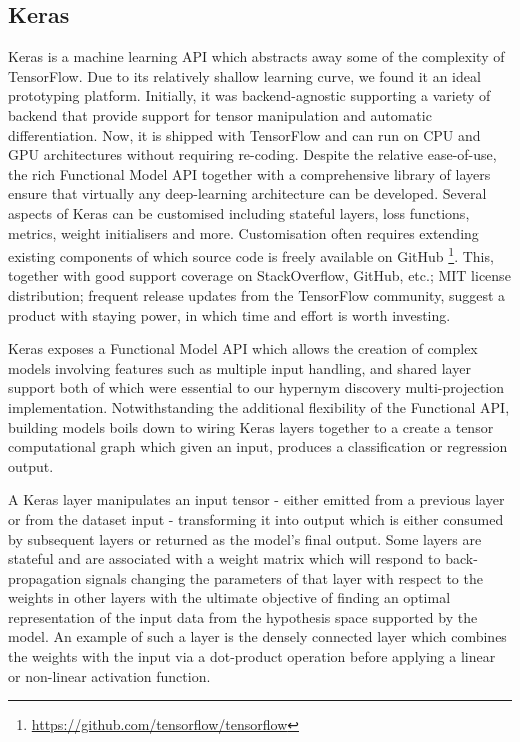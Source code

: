 \subsection{Keras}
Keras is a machine learning API which abstracts away some of the complexity of TensorFlow.  Due to its relatively shallow learning curve, we found it an ideal prototyping platform.  Initially, it was backend-agnostic supporting a variety of backend that provide support for tensor manipulation and automatic differentiation.  Now, it is shipped with TensorFlow and can run on CPU and GPU architectures without requiring re-coding.  Despite the relative ease-of-use, the rich Functional Model API together with a comprehensive library of layers ensure that virtually any deep-learning architecture can be developed.  Several aspects of Keras can be customised including stateful layers, loss functions, metrics, weight initialisers and more.  Customisation often requires extending existing components of which source code is freely available on GitHub \footnote{\url{https://github.com/tensorflow/tensorflow}}.  This, together with good support coverage on StackOverflow, GitHub, etc.; MIT license distribution; frequent release updates from the TensorFlow community, suggest a product with staying power, in which time and effort is worth investing.

Keras exposes a Functional Model API which allows the creation of complex models involving features such as multiple input handling, and shared layer support both of which were essential to our hypernym discovery multi-projection implementation.  Notwithstanding the additional flexibility of the Functional API, building models boils down to wiring Keras layers together to a create a tensor computational graph which given an input, produces a classification or regression output.  

A Keras layer manipulates an input tensor - either emitted from a previous layer or from the dataset input - transforming it into output which is either consumed by subsequent layers or returned as the model's final output.  Some layers are stateful and are associated with a weight matrix which will respond to back-propagation signals changing the parameters of that layer with respect to the weights in other layers with the ultimate objective of finding an optimal representation of the input data from the hypothesis space supported by the model.  An example of such a layer is the densely connected layer which combines the weights with the input via a dot-product operation before applying a linear or non-linear activation function.  

